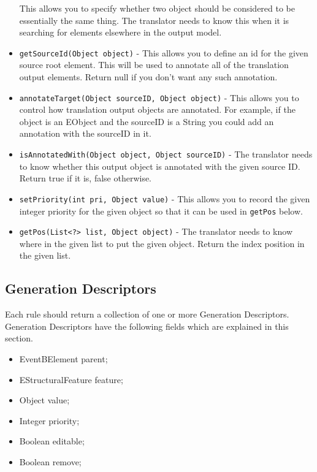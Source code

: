 \begin{itemize}
 	This allows you to specify whether two object should be considered to be essentially the same thing.
 	The translator needs to know this when it is searching for elements elsewhere in the output model.
 	\item \texttt{getSourceId(Object object)} -
 	This allows you to define an id for the given source root element.
 	This will be used to annotate all of the translation output elements.
 	Return null if you don't want any such annotation.
 	\item \texttt{annotateTarget(Object sourceID, Object object)} -
 	This allows you to control how translation output objects are annotated.
 	For example, if the object is an EObject and the sourceID is a String you could add an annotation with the sourceID in it. 
 	\item \texttt{isAnnotatedWith(Object object, Object sourceID)} - 
 	The translator needs to know whether this output object is annotated with the given source ID.
 	Return true if it is, false otherwise.
 	\item \texttt{setPriority(int pri, Object value)} -
 	This allows you to record the given integer priority for the given object so that it can be used in \texttt{getPos} below. 
 	\item \texttt{getPos(List<?> list, Object object)} -
 	The translator needs to know where in the given list to put the given object.
 	Return the index position in the given list.
 	
\end{itemize}

\subsection{Generation Descriptors}
\label{sec:descriptors}

Each rule should return a collection of one or more Generation Descriptors. Generation Descriptors have the following fields which are explained in this section.

\begin{itemize}
	\item EventBElement parent;
	\item EStructuralFeature feature;
	\item Object value;
	\item Integer priority;
	\item Boolean editable;
	\item Boolean remove;
\end{itemize}

